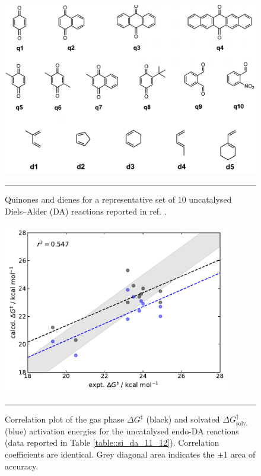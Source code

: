 \documentclass[../../main.tex]{subfiles}
\begin{document}
\begin{figure}[h!]
	\vspace{0.4cm}
	\centering
	\includegraphics[width=13cm]{3/da//figs/figS20}
	\vspace{0.2cm}
	\hrule
	\caption{Quinones and dienes for a representative set of 10 uncatalysed Diels–Alder (DA) reactions reported in ref. \cite{MartCentelles2018}.}
	\label{fig::si_da_20}
\end{figure}



\begin{figure}[h!]
	\vspace{0.4cm}
	\centering
	\includegraphics[width=10cm]{3/da//figs/figS21}
	\vspace{0.2cm}
	\hrule
	\caption{Correlation plot of the gas phase $\Delta G^\ddagger$ (black) and solvated $\Delta G^\ddagger_\text{solv.}$ (blue) activation energies for the uncatalysed endo-DA reactions (data reported in Table \ref{table::si_da_11_12}). Correlation coefficients are identical. Grey diagonal area indicates the $\pm$1 \kcalx area of accuracy.}
	\label{fig::si_da_21}
\end{figure}
\end{document}
